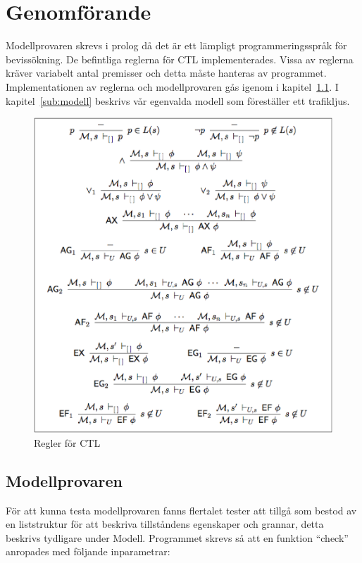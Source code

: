 \section{Genomförande}
Modellprovaren skrevs i prolog då det är ett lämpligt programmeringsspråk för bevissökning. De befintliga reglerna för CTL implementerades. Vissa av reglerna kräver variabelt antal premisser och detta måste hanteras av programmet. Implementationen av reglerna och modellprovaren gås igenom i kapitel~\ref{sub:modellprovaren}. I kapitel~\ref{sub:modell} beskrivs vår egenvalda modell som föreställer ett trafikljus.

\begin{figure}[hb]
\includegraphics[width=\textwidth]{formulas.eps}
\caption{Regler för CTL}
\label{fig:ctl-regler}
\end{figure}

\subsection{Modellprovaren}\label{sub:modellprovaren}

För att kunna testa modellprovaren fanns flertalet tester att tillgå som bestod av en liststruktur för att beskriva tillståndens egenskaper och grannar, detta beskrivs tydligare under Modell.
Programmet skrevs så att en funktion “check” anropades med följande inparametrar:

